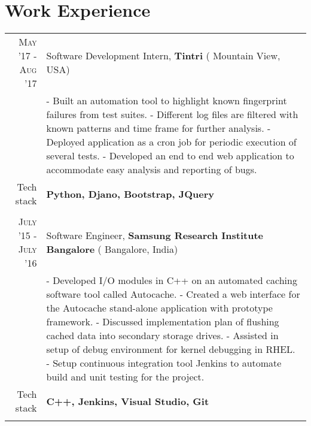 \section{Work Experience}
\renewcommand{\arraystretch}{0.95}%
\begin{tabular}{r|p{14cm}}
\textsc{May '17 - Aug '17} & Software Development Intern, \textbf{Tintri} ( Mountain View, USA)\\
& \small{
- Built an automation tool to highlight known fingerprint failures from test suites. \newline
- Different log files are filtered with known patterns and time frame for further analysis.\newline
- Deployed application as a cron job for periodic execution of several tests.\newline
- Developed an end to end web application to accommodate easy analysis and reporting of bugs.} \\
\small{Tech stack} &\footnotesize{\textbf{Python, Djano, Bootstrap, JQuery}} \\
\multicolumn{2}{c}{} \\

\textsc{July '15 - July '16} & Software Engineer, \textbf{Samsung Research Institute Bangalore} ( Bangalore, India) \\
& \small{
- Developed I/O modules in C++ on an automated caching software tool called Autocache.\newline
- Created a web interface for the Autocache stand-alone application with prototype framework.\newline
- Discussed implementation plan of flushing cached data into secondary storage drives.\newline
- Assisted in setup of debug environment for kernel debugging in RHEL. \newline
- Setup continuous integration tool Jenkins to automate build and unit testing for the project.}\\
\small{Tech stack} &\footnotesize{\textbf{C++, Jenkins, Visual Studio, Git}} \\
\multicolumn{2}{c}{} \\




\end{tabular}
